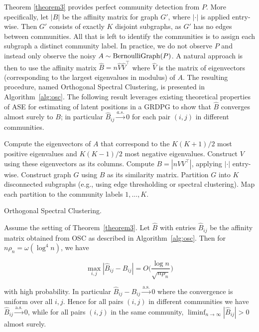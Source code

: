 \documentclass[12pt]{article}
\begin{document}
Theorem \ref{theorem3} provides perfect community detection from \(P\).
More specifically, let \(|B|\) be the affinity matrix for graph \(G'\), 
where $|\cdot|$ is applied entry-wise. Then
\(G'\) consists of exactly \(K\) disjoint subgraphs, 
as $G'$ has no edges between communities. 
All that is left to identify the communities is 
to assign each subgraph a distinct community label. 
In practice, we do not observe $P$ and instead only observe the noisy
$A \sim \mathrm{BernoulliGraph}(P)$. A natural approach is then to use
the affinity matrix $\hat{B} = n \hat{V} \hat{V}^{\top}$ where
$\hat{V}$ is the matrix of eigenvectors (corresponding to the largest
eigenvalues in modulus) of $A$. The resulting procedure, named
Orthogonal Spectral Clustering, is presented in
Algorithm~\ref{alg:osc}.
The following result leverages existing theoretical properties
of ASE for estimating of latent positions in a GRDPG \citep{rubindelanchy2017statistical} to show that
$\hat{B}$ converges almost surely to $B$; in particular 
 $\hat{B}_{ij} \stackrel{a.s.}{\to} 0$ 
for each pair $(i, j)$ in different communities. 

\begin{algorithm}[tp]
  \label{alg:osc}
  \DontPrintSemicolon
  \SetAlgoLined
    Compute the eigenvectors of $A$ that correspond to the $K (K+1) / 2$ most
    positive eigenvalues and $K (K-1) / 2$ most negative eigenvalues. Construct
    $V$ using these eigenvectors as its columns.\;
    Compute $B = |n V V^\top|$, applying $|\cdot|$ entry-wise.\;
    Construct graph $G$ using $B$ as its similarity matrix.\;
    Partition $G$ into $K$ disconnected subgraphs
    (e.g., using edge thresholding or spectral clustering).\;
    Map each partition to the community labels $1, ..., K$.\;
  \caption{Orthogonal Spectral Clustering.}
\end{algorithm}

\begin{theorem}
\label{theorem4}
Assume the setting of Theorem~\ref{theorem3}. 
Let $\hat{B}$ with entries $\hat{B}_{ij}$ be the affinity matrix
obtained from OSC as described in Algorithm~\ref{alg:osc}. 
Then for $n \rho_n = \omega(\log^{4}{n})$, we have

\begin{equation} \label{eq:thm4a}
\max_{i, j} |\hat{B}_{ij} - B_{ij}| = O\Big( \frac{\log n}{\sqrt{n \rho_n}} \Big)
\end{equation}

with high probability. In particular 
$\hat{B}_{ij} -B_{ij} \overset{\mathrm{a.s.}}{\rightarrow} 0$ 
where the convergence is
uniform over all $i,j$. Hence for all pairs $(i,j)$ in different
communities we have 
$\hat{B}_{ij} \overset{\mathrm{a.s.}}{\rightarrow} 0$, 
while for all pairs $(i, j)$ in the same community, 
$\liminf_{n \to \infty} |\hat{B}_{ij}| > 0$ almost surely. 
\end{theorem}
\end{document}
